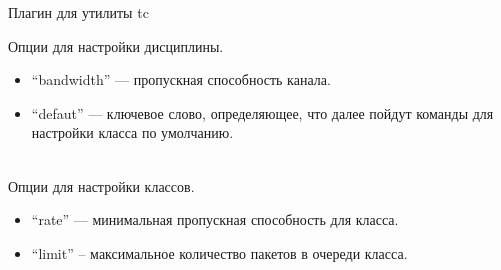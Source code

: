 \documentclass[12pt]{beamer}
\begin{document}
\begin{frame}{Плагин для утилиты tc}

	Опции для настройки дисциплины.
	\begin{itemize}
		\item ``bandwidth'' --- пропускная способность канала.
		\item ``defaut''	--- ключевое слово, определяющее, что далее пойдут команды для настройки класса по умолчанию.

	\end{itemize}
~\\
	Опции для настройки классов.
	\begin{itemize}
		\item ``rate'' --- минимальная пропускная способность для класса.
		\item ``limit'' -- максимальное количество пакетов в очереди класса.
	\end{itemize}

\end{frame}
\end{document}
